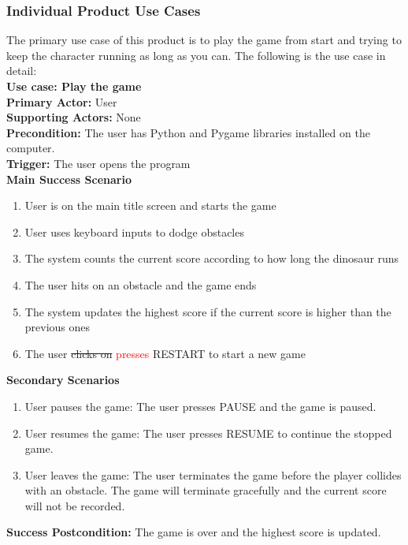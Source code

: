 \documentclass[12pt, titlepage]{article}
\begin{document}
\subsubsection{Individual Product Use Cases}
The primary use case of this product is to play the game from start and trying to keep the character running as long as you can. The following is the use case in detail:\\\newline
\textbf{Use case: Play the game}\\
\textbf{Primary Actor:} User\\
\textbf{Supporting Actors:} None\\
\textbf{Precondition:} The user has Python and Pygame libraries installed on the computer.\\
\textbf{Trigger:} The user opens the program\\
\textbf{Main Success Scenario}
\begin{enumerate}
    \item User is on the main title screen and starts the game
    \item User uses keyboard inputs to dodge obstacles
    \item The system counts the current score according to how long the dinosaur runs
    \item The user hits on an obstacle and the game ends
    \item The system updates the highest score if the current score is higher than the previous ones
    \item The user \sout{clicks on} \textcolor{red}{presses} RESTART to start a new game
\end{enumerate}
\textbf{Secondary Scenarios}
\begin{enumerate}
    \item User pauses the game: The user presses PAUSE and the game is paused.
    \item User resumes the game: The user presses RESUME to continue the stopped game. 
    \item User leaves the game: The user terminates the game before the player collides with an obstacle. The game will terminate gracefully and the current score will not be recorded.
\end{enumerate}
\textbf{Success Postcondition:} The game is over and the highest score is updated.
\end{document}
